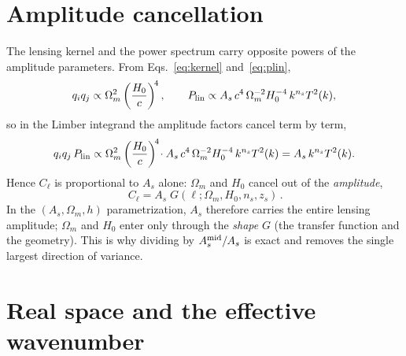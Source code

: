 \documentclass[11pt]{article}
\newcommand{\Om}{\Omega_m}
\newcommand{\As}{A_s}
\newcommand{\ns}{n_s}
\begin{document}
\section{Amplitude cancellation}

The lensing kernel and the power spectrum carry opposite powers of
the amplitude parameters. From Eqs.~\eqref{eq:kernel}
and~\eqref{eq:plin},
\begin{equation}
  q_i q_j \propto \Om^2\left(\frac{H_0}{c}\right)^{\!4},
  \qquad
  P_{\rm lin}\propto \As\,c^4\,\Om^{-2} H_0^{-4}\,k^{\ns}T^2(k),
\end{equation}
so in the Limber integrand the amplitude factors cancel term by
term,
\begin{equation}
  q_i q_j\,P_{\rm lin}\propto
  \Om^2\left(\frac{H_0}{c}\right)^{\!4}\!\cdot
  \As\,c^4\,\Om^{-2} H_0^{-4}\,k^{\ns}T^2(k)
  = \As\,k^{\ns}T^2(k).
\end{equation}
Hence $C_\ell$ is proportional to $\As$ alone: $\Om$ and $H_0$
cancel out of the \emph{amplitude},
\begin{equation}
  \boxed{\,C_\ell = \As\;G(\ell;\Om,H_0,\ns,z_s)\,}.
  \label{eq:Ascancel}
\end{equation}
In the $(\As,\Om,h)$ parametrization, $\As$ therefore carries the
entire lensing amplitude; $\Om$ and $H_0$ enter only through the
\emph{shape} $G$ (the transfer function and the geometry). This is
why dividing by $\As^{\rm mid}/\As$ is exact and removes the single
largest direction of variance.

\section{Real space and the effective wavenumber}
\end{document}

